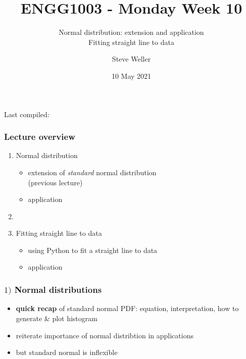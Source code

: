 \documentclass[english,14pt]{beamer}
\title{ENGG1003 - Monday Week 10}
\subtitle{Normal distribution: extension and application \\ Fitting straight line to data}%
\author{Steve Weller}
\institute{University of Newcastle}
\date{10 May 2021}
\begin{document}
\begin{flushleft}
{\scriptsize Last compiled:~\DTMnow}
\vspace*{-5mm}
\end{flushleft}
\framebreak


\begin{frame}[fragile]

\frametitle{Lecture overview}
\begin{enumerate}
	\item Normal distribution
		\begin{itemize}
			\item extension of \emph{standard} normal distribution \\ (previous lecture)
			\item application
		\end{itemize}	
	\item[]
	
	\item Fitting straight line to data
	\begin{itemize}
		\item using Python to fit a straight line to data
		\item application
	\end{itemize}	
\end{enumerate}

\end{frame}


\begin{frame}[fragile]

\frametitle{$1)$ Normal distributions}

\begin{itemize}
	\item \textbf{quick recap} of standard normal PDF: equation, interpretation, how to generate \& plot histogram
	\item reiterate importance of normal distribtion in applications
	\item but standard normal is inflexible
\end{itemize}

\end{frame}

\end{document}

